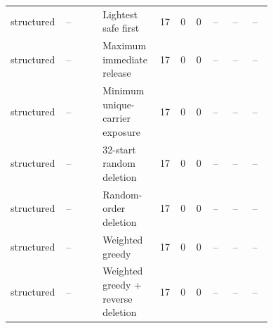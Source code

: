 {\begin{longtable}{p{0.075\linewidth}p{0.13\linewidth}p{0.14\linewidth}p{0.055\linewidth}p{0.055\linewidth}p{0.065\linewidth}p{0.075\linewidth}p{0.075\linewidth}p{0.075\linewidth}}
structured & -- & Lightest safe first & 17 & 0 & 0 & -- & -- & -- \\
structured & -- & Maximum immediate release & 17 & 0 & 0 & -- & -- & -- \\
structured & -- & Minimum unique-carrier exposure & 17 & 0 & 0 & -- & -- & -- \\
structured & -- & 32-start random deletion & 17 & 0 & 0 & -- & -- & -- \\
structured & -- & Random-order deletion & 17 & 0 & 0 & -- & -- & -- \\
structured & -- & Weighted greedy & 17 & 0 & 0 & -- & -- & -- \\
structured & -- & Weighted greedy + reverse deletion & 17 & 0 & 0 & -- & -- & -- \\
\bottomrule
\end{longtable}
}
